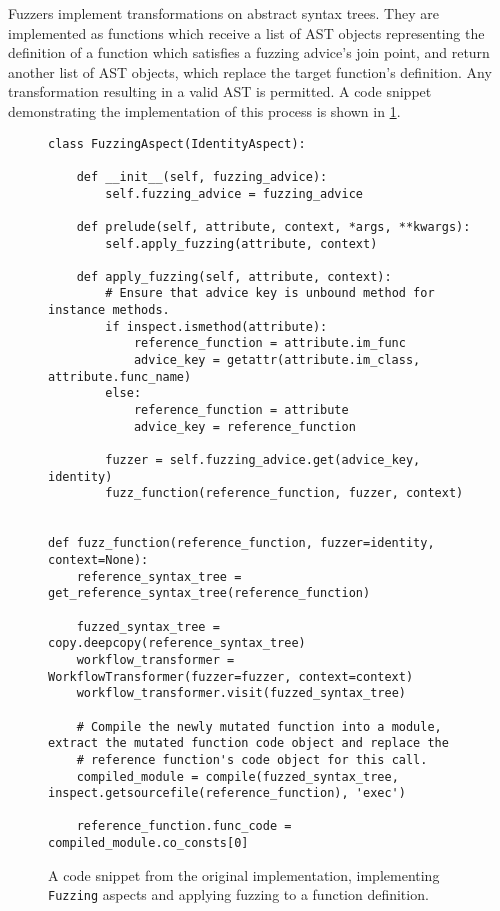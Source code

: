 Fuzzers implement transformations on abstract syntax trees. They are implemented
as functions which receive a list of AST objects representing the definition of
a function which satisfies a fuzzing advice's join point, and return another
list of AST objects, which replace the target function's definition. Any
transformation resulting in a valid AST is permitted. A code snippet
demonstrating the implementation of this process is shown in
\cref{fig:v1_pdsf_fuzzing_impl_codesnippet}.

\begin{figure}
\begin{lstlisting}
class FuzzingAspect(IdentityAspect):

    def __init__(self, fuzzing_advice):
        self.fuzzing_advice = fuzzing_advice

    def prelude(self, attribute, context, *args, **kwargs):
        self.apply_fuzzing(attribute, context)

    def apply_fuzzing(self, attribute, context):
        # Ensure that advice key is unbound method for instance methods.
        if inspect.ismethod(attribute):
            reference_function = attribute.im_func
            advice_key = getattr(attribute.im_class, attribute.func_name)
        else:
            reference_function = attribute
            advice_key = reference_function

        fuzzer = self.fuzzing_advice.get(advice_key, identity)
        fuzz_function(reference_function, fuzzer, context)


def fuzz_function(reference_function, fuzzer=identity, context=None):
    reference_syntax_tree = get_reference_syntax_tree(reference_function)

    fuzzed_syntax_tree = copy.deepcopy(reference_syntax_tree)
    workflow_transformer = WorkflowTransformer(fuzzer=fuzzer, context=context)
    workflow_transformer.visit(fuzzed_syntax_tree)

    # Compile the newly mutated function into a module, extract the mutated function code object and replace the
    # reference function's code object for this call.
    compiled_module = compile(fuzzed_syntax_tree, inspect.getsourcefile(reference_function), 'exec')

    reference_function.func_code = compiled_module.co_consts[0]
\end{lstlisting}
\caption{A code snippet from the original \pdsf implementation, implementing
\lstinline{Fuzzing} aspects and applying fuzzing to a function definition.}
\label{fig:v1_pdsf_fuzzing_impl_codesnippet}
\end{figure}

